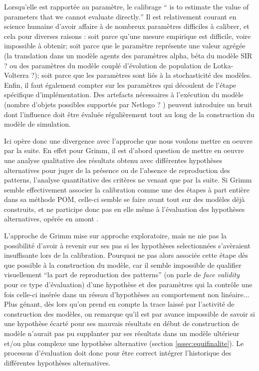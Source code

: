 Lorsqu'elle est rapportée au paramètre, le calibrage \foreignquote{english}{ is to estimate the value of parameters that we cannot evaluate directly.} Il est relativement courant en science humaine d'avoir affaire à de nombreux paramètres difficiles à calibrer, et cela pour diverses raisons : soit parce qu'une mesure empirique est difficile, voire impossible à obtenir; soit parce que le paramètre représente une valeur agrégée (la translation dans un modèle agents des paramètres alpha, béta du modèle SIR ? ou des paramètres du modèle couplé d'évolution de population de Lotka-Volterra ?); soit parce que les paramètres sont liés à la stochasticité des modèles. Enfin, il faut également compter sur les paramètres qui découlent de l'étape spécifique d'implémentation. Des artefacts nécessaires à l'exécution du modèle (nombre d'objets possibles supportés par Netlogo ? ) peuvent introduire un bruit dont l'influence doit être évaluée régulièrement tout au long de la construction du modèle de simulation.

Ici opère donc une divergence avec l'approche que nous voulons mettre en oeuvre par la suite. En effet pour Grimm, il est d'abord question de mettre en oeuvre une analyse qualitative des résultats obtenu avec différentes hypothèses alternatives pour juger de la présence ou de l'absence de reproduction des patterns, l'analyse quantitative des critères ne venant que par la suite. Si Grimm semble effectivement associer la calibration comme une des étapes à part entière dans sa méthode POM, celle-ci semble se faire avant tout sur des modèles déjà construits, et ne participe donc pas en elle même à l'évaluation des hypothèses alternatives, opérée en amont . 

L'approche de Grimm mise sur approche exploratoire, mais ne nie pas la possibilité d'avoir à revenir sur ses pas si les hypothèses selectionnées s'avèraient insuffisante lors de la calibration. Pourquoi ne pas alors associée cette étape dès que possible à la construction du modèle, car il semble impossible de qualifier visuellement \enquote{la part de reproduction des patterns} (on parle de \textit{face validity} pour ce type d'évaluation) d'une hypothèse et des paramètres qui la contrôle une fois celle-ci insérée dans un réseau d'hypothèses au comportement non linéaire...  Plus génant, dès lors qu'on prend en compte la trace laissé par l'activité de construction des modèles, on remarque qu'il est par avance impossible de savoir si une hypothèse écarté pour ses mauvais résultats en début de construction de modèle n'aurait pas pu supplanter par ses résultats dans un modèle ultérieur et/ou plus complexe une hypothèse alternative (section \ref{sssec:equifinalite}). Le processus d'évaluation doit donc pour être correct intégrer l'historique des différentes hypothèses alternatives.

